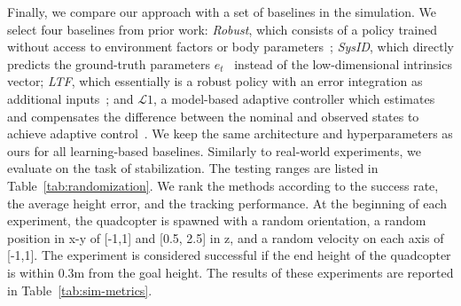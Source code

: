 Finally, we compare our approach with a set of baselines in the simulation.
%
We select four baselines from prior work: \emph{Robust}, which consists of a policy trained without access to environment factors or body parameters~\cite{tobin2017domain, peng2018sim}; \emph{SysID}, which directly predicts the ground-truth parameters $e_t$~\cite{SysID} instead of the low-dimensional intrinsics vector; \emph{LTF}, which essentially is a robust policy with an error integration as additional inputs~\cite{LTF}; and $\mathcal{L}1$, a model-based adaptive controller which estimates and compensates the difference between the nominal and observed states to achieve adaptive control~\cite{cao2008design,hovakimyan2010l1,hanover2021performance}. 
%
We keep the same architecture and hyperparameters as ours for all learning-based baselines. 
%
%
Similarly to real-world experiments, we evaluate on the task of stabilization. The testing ranges are listed in Table~\ref{tab:randomization}. We rank the methods according to the success rate, the average height error, and the tracking performance.
%
At the beginning of each experiment, the quadcopter is spawned with a random orientation, a random position in x-y of [-1,1] and [0.5, 2.5] in z, and a random velocity on each axis of [-1,1].
%
The experiment is considered successful if the end height of the quadcopter is within 0.3m from the goal height.
%
The results of these experiments are reported in Table~\ref{tab:sim-metrics}. 
%

